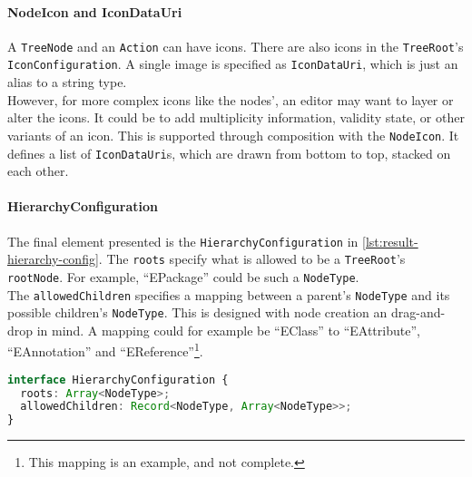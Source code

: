 \paragraph{NodeIcon and IconDataUri}
A \texttt{TreeNode} and an \texttt{Action} can have icons.
There are also icons in the \texttt{TreeRoot}'s \texttt{IconConfiguration}.
A single image is specified as \texttt{IconDataUri}, which is just an alias to a string type.\\
However, for more complex icons like the nodes', an editor may want to layer or alter the icons.
It could be to add multiplicity information, validity state, or other variants of an icon.
This is supported through composition with the \texttt{NodeIcon}.
It defines a list of \texttt{IconDataUri}s, which are drawn from bottom to top, stacked on each other.

\paragraph{HierarchyConfiguration}
The final element presented is the \texttt{HierarchyConfiguration} in \cref{lst:result-hierarchy-config}.
The \texttt{roots} specify what is allowed to be a \texttt{TreeRoot}'s \texttt{rootNode}.
For example, ``EPackage'' could be such a \texttt{NodeType}.\\

The \texttt{allowedChildren} specifies a mapping between a parent's \texttt{NodeType} and its possible children's \texttt{NodeType}.
This is designed with node creation an drag-and-drop in mind.
A mapping could for example be ``EClass'' to ``EAttribute'', ``EAnnotation'' and ``EReference''\footnote{This mapping is an example, and not complete.}.

\begin{lstlisting}[language=Typescript, label={lst:result-hierarchy-config}, caption={[HierarchyConfiguration]HierarchyConfiguration TypeScript code.}]
interface HierarchyConfiguration {
  roots: Array<NodeType>;
  allowedChildren: Record<NodeType, Array<NodeType>>;
}
\end{lstlisting}